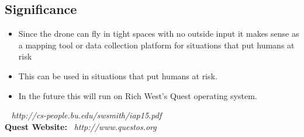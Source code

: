 \documentclass{lposter}
\theoremstyle{plain}
\theoremstyle{definition}
\begin{document}
\begin{poster}
\section{Significance}

\begin{itemize}
\item Since the drone can fly in tight spaces with no outside input it makes sense as a mapping tool or data collection platform for situations that put humans at risk
\item This can be used in situations that put humans at risk.
\item In the future this will run on Rich West's Quest operating system.
\end{itemize}

~ {\it http://cs-people.bu.edu/swsmith/iap15.pdf}\\
{\bf Quest Website:}~ {\it http://www.questos.org}



\end{poster}
\end{document}
